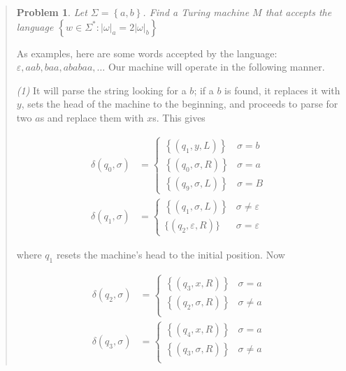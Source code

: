 \documentclass[a4paper, 12pt]{article}
\newtheorem{problem}{Problem}
\newtheorem{problem}{Problem}
\begin{document}
\small
\begin{quote}

\begin{problem}
    Let $\Sigma = \left\{ a, b \right\} $. Find a Turing machine $M$ that
    accepts the language $ \left\{ w \in \Sigma^{*} : |\omega|_a = 2|\omega|_b
    \right\} $
\end{problem}

As examples, here are some words accepted by the language: $\varepsilon, aab, baa,
ababaa, \ldots$ Our machine will operate in the following manner.

\textit{(1)} It will parse the string looking for a $b$; if a $b$ is found, it
replaces it with $y$, sets the head of the machine to the beginning, and
proceeds to parse for two $a$s and replace them with $x$s. This gives 

\begin{align*}
    \delta(q_0, \sigma) &= \begin{cases}
        \left\{ \left( q_1, y, L \right)  \right\} & \sigma = b\\
        \left\{ \left( q_0, \sigma, R \right)  \right\} & \sigma = a\\
        \left\{ \left( q_9, \sigma, L \right)  \right\} & \sigma = B
    \end{cases} \\
    \delta(q_1, \sigma) &= \begin{cases}
        \left\{ \left( q_1, \sigma, L \right)  \right\} & \sigma \neq \varepsilon
        \\ 
        \{ (q_2, \varepsilon, R) \} & \sigma = \varepsilon
    \end{cases}
\end{align*}

where $q_1$ resets the machine's head to the initial position. Now 

\begin{align*}
    \delta(q_2, \sigma) &= \begin{cases}
        \left\{ (q_3, x, R) \right\}  & \sigma = a \\ 
        \left\{ (q_2, \sigma, R) \right\}  & \sigma \neq a \\ 
    \end{cases}\\
    \delta(q_3, \sigma) &= \begin{cases}
        \left\{ (q_4, x, R) \right\}  & \sigma = a \\ 
        \left\{ (q_3, \sigma, R) \right\}  & \sigma \neq a \\ 
    \end{cases}
\end{align*}


\end{quote}
\end{document}
